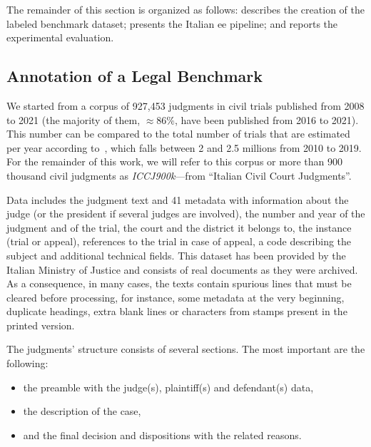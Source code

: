 The remainder of this section is organized as follows:  describes the creation of the labeled benchmark dataset;  presents the Italian \ac{ee} pipeline; and  reports the experimental evaluation.

\subsection{Annotation of a Legal Benchmark}
\label{sec:judgements_labeled_data}

We started from a corpus of 927,453 judgments in civil trials published from 2008 to 2021 (the majority of them, $\approx 86\%$, have been published from 2016 to 2021).
This number can be compared to the total number of trials that are estimated per year according to~\cite{bankitalia}, which falls between 2 and 2.5 millions from 2010 to 2019.
For the remainder of this work, we will refer to this corpus or more than 900 thousand civil judgments as \emph{ICCJ900k}---from ``Italian Civil Court Judgments''.

Data includes the judgment text and 41 metadata with information about the judge (or the president if several judges are involved), the number and year of the judgment and of the trial, the court and the district it belongs to, the instance (trial or appeal), references to the trial in case of appeal, a code describing the subject and additional technical fields. This dataset has been provided by the Italian Ministry of Justice and consists of real documents as they were archived. As a consequence, in many cases, the texts contain spurious lines that must be cleared before processing, for instance, some metadata at the very beginning, duplicate headings, extra blank lines or characters from stamps present in the printed version.

The judgments' structure consists of several sections. The most important are the following:
\begin{itemize}
    \item the preamble with the judge(s), plaintiff(s) and defendant(s) data,
    \item the description of the case,
    \item and the final decision and dispositions with the related reasons.
\end{itemize}



